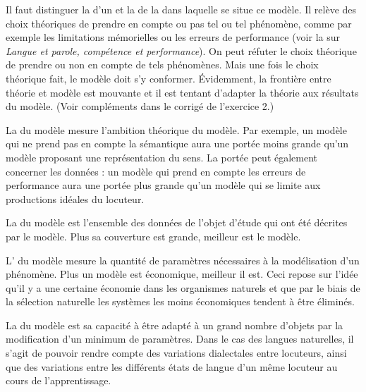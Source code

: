 Il faut distinguer la  d’un  et la  de la  dans laquelle se situe ce modèle. Il relève des choix théoriques de prendre en compte ou pas tel ou tel phénomène, comme par exemple les limitations mémorielles ou les erreurs de performance (voir la  sur \textit{Langue et parole, compétence et performance}). On peut réfuter le choix théorique de prendre ou non en compte de tels phénomènes. Mais une fois le choix théorique fait, le modèle doit s’y conformer. Évidemment, la frontière entre théorie et modèle est mouvante et il est tentant d’adapter la théorie aux résultats du modèle. (Voir compléments dans le corrigé de l’exercice 2.)

La  du modèle mesure l’ambition théorique du modèle. Par exemple, un modèle qui ne prend pas en compte la sémantique aura une portée moins grande qu’un modèle proposant une représentation du sens. La portée peut également concerner les données : un modèle qui prend en compte les erreurs de performance aura une portée plus grande qu’un modèle qui se limite aux productions idéales du locuteur.

La  du modèle est l’ensemble des données de l’objet d’étude qui ont été décrites par le modèle. Plus sa couverture est grande, meilleur est le modèle.

L’ du modèle mesure la quantité de paramètres nécessaires à la modélisation d’un phénomène. Plus un modèle est économique, meilleur il est. Ceci repose sur l’idée qu’il y a une certaine économie dans les organismes naturels et que par le biais de la sélection naturelle les systèmes les moins économiques tendent à être éliminés.

La  du modèle est sa capacité à être adapté à un grand nombre d’objets par la modification d’un minimum de paramètres. Dans le cas des langues naturelles, il s’agit de pouvoir rendre compte des variations dialectales entre locuteurs, ainsi que des variations entre les différents états de langue d’un même locuteur au cours de l’apprentissage.


